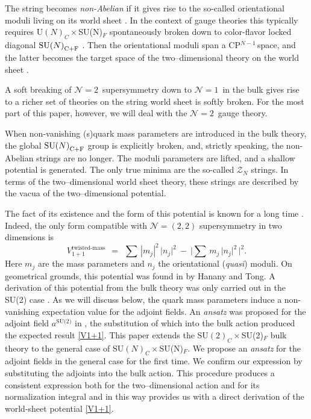 \documentclass[12pt]{article}
\def\beq{\begin{equation}}
\def\eeq{\end{equation}}
\newcommand{\nonen}{${\mathcal N}=1$}
\newcommand{\ntwon}{${\mathcal N}=2$}
\newcommand{\ntwot}{${\mathcal N}= \left(2,2\right) $ }
\newcommand{\mc}[1]{\mathcal{#1}}
\def\cfl {$\text{SU($N$)}_{\rm C+F}$ }
\newcommand{\cpn}{CP$^{N-1}$\,}
\newcommand{\ansatz}{{\it ansatz} }
\begin{document}
	The string becomes {\it non-Abelian} if it gives rise to the so-called orientational moduli living on
	its world sheet \cite{HT1,ABEKY,SYmon,HT2}. In the context of gauge theories this typically requires U$(N)_C\times$SU(N)$_F$
	spontaneously broken down to color-flavor locked  diagonal $\!$\cfl.
	Then the orientational moduli  span a \cpn space, and 
	the latter becomes the target space of the two--dimensional theory on the world sheet \cite{SYrev}.

	A soft breaking of \ntwon\, supersymmetry down to
	\nonen\, in the bulk gives rise to a richer  set of theories on the string world sheet
	is softly broken.
	For the most part of this paper, however, we will deal with the \ntwon\, gauge theory.

	When non-vanishing (s)quark mass parameters are introduced in  the bulk theory, 
	the global \cfl group is explicitly broken, and, strictly speaking,
	the non-Abelian strings are no longer.
	The moduli parameters are lifted, and a shallow potential is generated. The only true minima  are the so-called $ \mc{Z}_N $ strings.
	In terms of the two--dimensional world sheet theory, these strings are described by
	the vacua of the two--dimensional potential.

	The fact of its existence and the form of this potential is known for a long time 
\cite{Dorey:1998yh,HT2,Shifman:2006bs}.
	Indeed, the only form compatible with \ntwot supersymmetry in two dimensions is
\beq
\label{V1+1}
	V_{1+1}^\text{twisted-mass}    ~~=~~    \sum\, | m_j |^2\, \big| n_j \big|^2   ~-~  \Big| \sum\, m_j\, \big| n_j \big|^2 \,\Big|^2.
\eeq
	Here $ m_j $ are the mass parameters and $ n_j $ the orientational ({\it quasi}) moduli.
	On geometrical grounds, this potential was found in \cite{HT2} by Hanany and Tong. 
	A derivation of this potential from the bulk theory was only carried out in the SU(2) case \cite{SYmon}.
	As we will discuss below, the quark mass parameters induce a non-vanishing expectation value for the adjoint fields.
	An \ansatz was proposed for the adjoint field $ a^\text{SU(2)} $ in \cite{SYmon},
	the substitution of which into the bulk action produced the expected result \eqref{V1+1}.
	This paper extends the SU$(2)_C\times$SU(2)$_F$ bulk theory to the general case of SU$(N)_C\times$SU(N)$_F$.
	We propose an \ansatz for the adjoint fields in the general case  for the first time.
	We confirm our expression by substituting the adjoints into the bulk action. 
	This procedure produces a consistent expression both for the two--dimensional action and for its normalization integral
	and in this way provides us with a direct
	derivation of the world-sheet potential \eqref{V1+1}.
\end{document}
